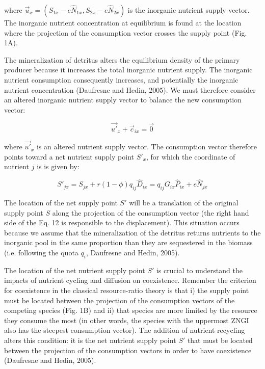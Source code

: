 \documentclass[letterpaper,twocolumn,showkeys]{revtex4-1}
\begin{document}
where $\overrightarrow{u}_{x}=(S_{1x}-e\widehat{N}_{1x},S_{2x}-e\widehat{N}_{2x})$ is the inorganic nutrient supply vector. The inorganic nutrient concentration at equilibrium is found at the location where the projection of the consumption vector crosses the supply point (Fig. 1A). 

	The mineralization of detritus alters the equilibrium density of the primary producer because it increases the total inorganic nutrient supply. The inorganic nutrient consumption consequently increases, and potentially the inorganic nutrient concentration (Daufresne and Hedin, 2005). We must therefore consider an altered inorganic nutrient supply vector to balance the new consumption vector:

\begin{equation}
	\label{e:bnet}
	\overrightarrow{u'}_{x}+\overrightarrow{c}_{ix}=\overrightarrow{0}
\end{equation}

where $\overrightarrow{u'}_{x}$ is an altered nutrient supply vector. The consumption vector therefore points toward a net nutrient supply point $S'_{x}$, for which the coordinate of nutrient $j$ is is given by:

\begin{equation}
	\label{e:bnet}
	S'_{jx}= S_{jx} + r(1-\phi)q_{ij}\widehat{D}_{ix} = q_{ij}G_{ix}\widehat{P}_{ix}+e\widehat{N}_{jx}
\end{equation}

The location of the net supply point $S'$ will be a translation of the original supply point $S$ along the projection of the consumption vector (the right hand side of the Eq. 12 is responsible to the displacement). This situation occurs because we assume that the mineralization of the detritus returns nutrients to the inorganic pool in the same proportion than they are sequestered in the biomass (i.e. following the quota $q_{i}$, Daufresne and Hedin, 2005). 

	The location of the net nutrient supply point $S'$ is crucial to understand the impacts of nutrient cycling and diffusion on coexistence. Remember the criterion for coexistence in the classical resource-ratio theory is that i) the supply point must be located between the projection of the consumption vectors of the competing species (Fig. 1B) and ii) that species are more limited by the resource they consume the most (in other words, the species with the uppermost ZNGI also has the steepest consumption vector). The addition of nutrient recycling alters this condition: it is the net nutrient supply point $S'$ that must be located between the projection of the consumption vectors in order to have coexistence (Daufresne and Hedin, 2005). 
\end{document}
